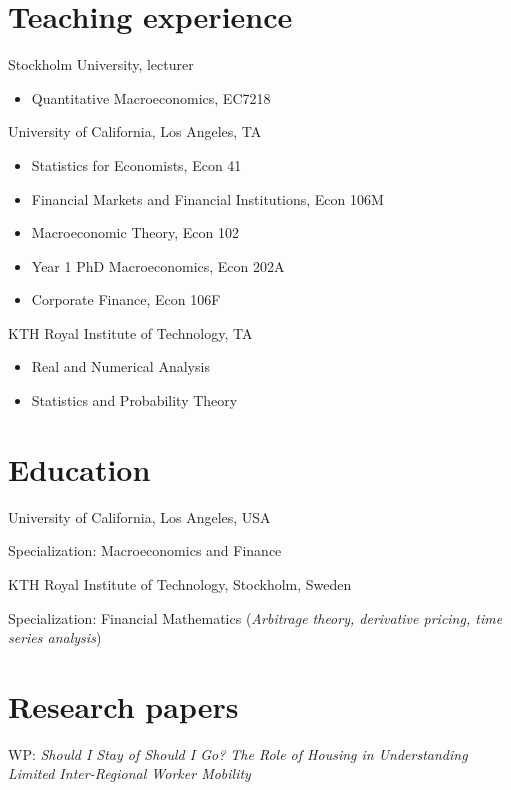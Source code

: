 \documentclass{clean_CV}
\begin{document}
\section{Teaching experience}
\eatvspace
\begin{multicols}{2}
Stockholm University, lecturer
\begin{itemize}
    \item Quantitative Macroeconomics, EC7218
\end{itemize}

\medskip

University of California, Los Angeles, TA
\begin{itemize}
    \item Statistics for Economists, Econ 41
    \item Financial Markets and Financial Institutions, Econ 106M
    \item Macroeconomic Theory, Econ 102
    \item Year 1 PhD Macroeconomics, Econ 202A
    \item Corporate Finance, Econ 106F
\end{itemize}

\medskip

KTH Royal Institute of Technology, TA
\begin{itemize}
    \item Real and Numerical Analysis
    \item Statistics and Probability Theory
\end{itemize}
\end{multicols}

\section{Education}


University of California, Los Angeles, USA

Specialization: Macroeconomics and Finance

\medskip


KTH Royal Institute of Technology, Stockholm, Sweden

Specialization: Financial Mathematics (\textit{Arbitrage theory, derivative pricing, time series analysis})


\section{Research papers}
WP: \textit{Should I Stay of Should I Go? The Role of Housing in Understanding Limited Inter-Regional Worker Mobility}
\end{document}
